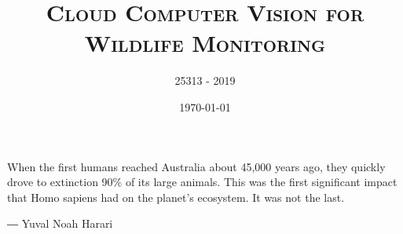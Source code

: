 \documentclass[a4paper,11pt]{report}
\title{\textsc{Cloud Computer Vision for Wildlife Monitoring}}
\author{\textsc{25313} - \textsc{2019}} %
\date{\today}
\begin{document}

\chapter*{} %
When the first humans reached Australia about 45,000 years ago, they quickly drove to extinction 90\% of its large animals. This was the first significant impact that Homo sapiens had on the planet's ecosystem. It was not the last.


― Yuval Noah Harari





\tableofcontents


\listoffigures %





 








\end{document}
